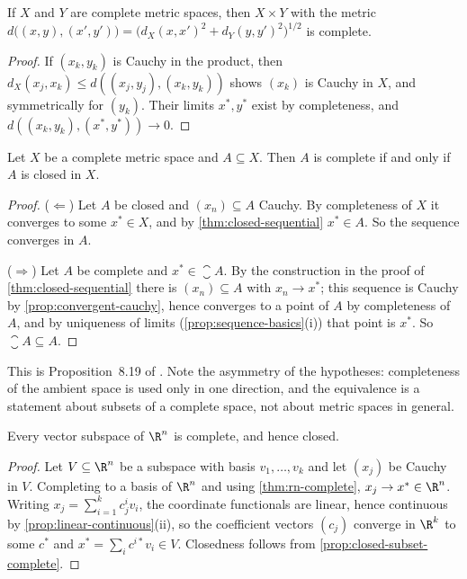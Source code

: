 \begin{proposition}[Products]\label{prop:product-complete}
	If $X$ and $Y$ are complete metric spaces, then $X\times Y$ with the metric
	$d\bigl((x,y),(x',y')\bigr)=\bigl(d_X(x,x')^2+d_Y(y,y')^2\bigr)^{1/2}$ is
	complete.
\end{proposition}

\begin{proof}
	If $(x_k,y_k)$ is Cauchy in the product, then $d_X(x_j,x_k)\leq d((x_j,y_j),(x_k,y_k))$
	shows $(x_k)$ is Cauchy in $X$, and symmetrically for $(y_k)$. Their limits
	$x^\ast,y^\ast$ exist by completeness, and
	$d((x_k,y_k),(x^\ast,y^\ast))\to0$.
\end{proof}

\begin{proposition}
	\label{prop:closed-subset-complete}
	Let $X$ be a complete metric space and $A\subseteq X$. Then $A$ is complete if
	and only if $A$ is closed in $X$.
\end{proposition}

\begin{proof}
	($\Leftarrow$) Let $A$ be closed and $(x_n)\subseteq A$ Cauchy. By completeness
	of $X$ it converges to some $x^\ast\in X$, and by
	\autoref{thm:closed-sequential} $x^\ast\in A$. So the sequence converges in $A$.

	($\Rightarrow$) Let $A$ be complete and $x^\ast\in\closure A$. By the
	construction in the proof of \autoref{thm:closed-sequential} there is
	$(x_n)\subseteq A$ with $x_n\to x^\ast$; this sequence is Cauchy by
	\autoref{prop:convergent-cauchy}, hence converges to a point of $A$ by
	completeness of $A$, and by uniqueness of limits
	(\autoref{prop:sequence-basics}(i)) that point is $x^\ast$. So
	$\closure A\subseteq A$.
\end{proof}

This is Proposition~8.19 of \textcite{fukuda2026notes}
\autocite[slide 62]{fukuda2026analysis}. Note the asymmetry of the hypotheses:
completeness of the ambient space is used only in one direction, and the
equivalence is a statement about subsets of a complete space, not about metric
spaces in general.

\begin{corollary}\label{cor:subspace-complete}
	Every vector subspace of $\R^n$ is complete, and hence closed.
\end{corollary}

\begin{proof}
	Let $V\subseteq\R^n$ be a subspace with basis $v_1,\dots,v_k$ and let $(x_j)$ be
	Cauchy in $V$. Completing to a basis of $\R^n$ and using
	\autoref{thm:rn-complete}, $x_j\to x^\ast\in\R^n$. Writing
	$x_j=\sum_{i=1}^k c^i_jv_i$, the coordinate functionals are linear, hence
	continuous by \autoref{prop:linear-continuous}(ii), so the coefficient vectors
	$(c_j)$ converge in $\R^k$ to some $c^\ast$ and $x^\ast=\sum_ic^{i\ast}v_i\in V$.
	Closedness follows from \autoref{prop:closed-subset-complete}.
\end{proof}


